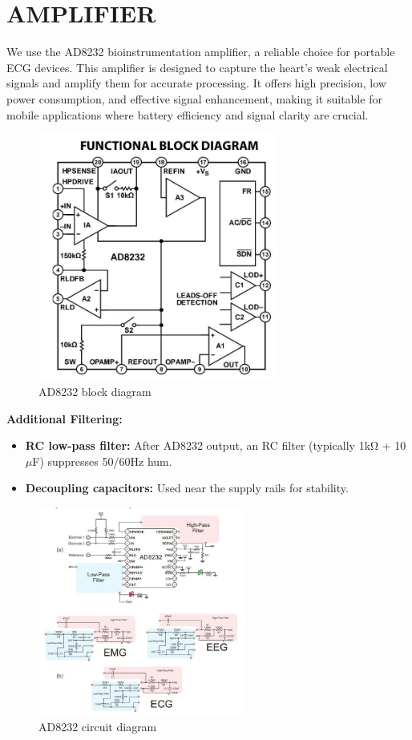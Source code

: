 \section{AMPLIFIER}
We use the AD8232\cite{AD8232} bioinstrumentation amplifier, a reliable choice for portable ECG devices. This amplifier is designed to capture the heart’s weak electrical signals and amplify them for accurate processing. It offers high precision, low power consumption, and effective signal enhancement, making it suitable for mobile applications where battery efficiency and signal clarity are crucial.
\begin{figure}[H]
    \centering
    \includegraphics[width=0.7\textwidth]{images/ad8232_block.jpg}
    \caption{AD8232 block diagram\cite{AD8232}}
    \label{fig:AD8232_block}
\end{figure}

\textbf{Additional Filtering:}
\begin{itemize}
    \item \textbf{RC low-pass filter:} After AD8232 output, an RC filter (typically 1kΩ + 10$\mu$F) suppresses 50/60Hz hum.
    \item \textbf{Decoupling capacitors:} Used near the supply rails for stability.
\end{itemize}

\begin{figure}[H]
    \centering
    \includegraphics[width=0.6\textwidth]{images/ad8232_circuit.jpg}
    \caption{AD8232 circuit diagram\cite{AD8232}}
    \label{fig:AD8232_circuit}
\end{figure}

